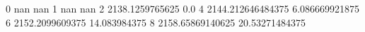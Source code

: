 0 nan nan
1 nan nan
2 2138.1259765625 0.0
4 2144.212646484375 6.086669921875
6 2152.2099609375 14.083984375
8 2158.65869140625 20.53271484375

